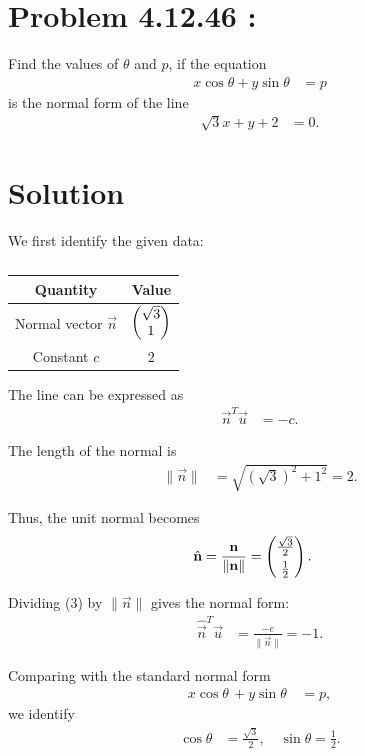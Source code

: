 \documentclass[12pt]{article}
\begin{document}
\section*{Problem 4.12.46 :}
Find the values of $\theta$ and $p$, if the equation
\begin{align}
x\cos\theta + y\sin\theta &= p
\end{align}
is the normal form of the line
\begin{align}
\sqrt{3}x + y + 2 &= 0.
\end{align}

\section*{Solution}

We first identify the given data:

\begin{table}[H]
\centering
\begin{tabular}{|c|c|}
\hline
\textbf{Quantity} & \textbf{Value} \\
\hline
Normal vector $\vec{n}$ & $\begin{pmatrix}\sqrt{3} \\ 1\end{pmatrix}$ \\
\hline
Constant $c$ & $2$ \\
\hline
\end{tabular}
\caption{}
\label{}
\end{table}

\noindent The line can be expressed as
\begin{align}
\vec{n}^T \vec{u} &= -c. \label{eq1}
\end{align}

The length of the normal is
\begin{align}
\|\vec{n}\| &= \sqrt{(\sqrt{3})^2 + 1^2} = 2. \label{eq2}
\end{align}

Thus, the unit normal becomes
\begin{align}
\hat{\mathbf{n}} &= \frac{\mathbf{n}}{\|\mathbf{n}\|} 
= \begin{pmatrix}\tfrac{\sqrt{3}}{2} \\[4pt] \tfrac{1}{2}\end{pmatrix}. \label{eq3}
\end{align}

Dividing (3) by $\|\vec{n}\|$ gives the normal form:
\begin{align}
\hat{\vec{n}}^T \vec{u} &= \frac{-c}{\|\vec{n}\|} = -1. \label{eq4}
\end{align}

Comparing with the standard normal form
\begin{align}
x\cos\theta\, + y\sin\theta\, &= p,
\end{align}
we identify
\begin{align}
\cos\theta &= \tfrac{\sqrt{3}}{2}, \quad 
\sin\theta = \tfrac{1}{2}. \label{eq5}
\end{align}
\end{document}
